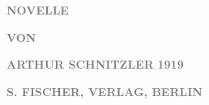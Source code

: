 \pstart
           \centering{}\textcolor{gray}{\textbf{NOVELLE}}\pend
           
\pstart
           \centering{}\textcolor{gray}{\textbf{VON}}\pend
           
\pstart
           \centering{}\textcolor{gray}{\textbf{ARTHUR SCHNITZLER}}\pend
           {\vspace{1\baselineskip}}
\pstart
           \centering{}\textcolor{gray}{\textbf{1919}}\pend
           
\pstart
           \centering{}\textcolor{gray}{\textbf{S. FISCHER, VERLAG, BERLIN}}\pend
           \endnumbering{}
\begin{anhang}
\end{anhang}\newcommand{\dateiname}{L03991}\newcommand{\titel}{Arthur Schnitzler: Widmungsexemplar von Casanovas Heimfahrt an Berta Zuckerkandl, Jänner 1919}\newcommand{\editorInnen}{Herausgegeben von Jahnke, SelmaMüller, Martin Anton}
